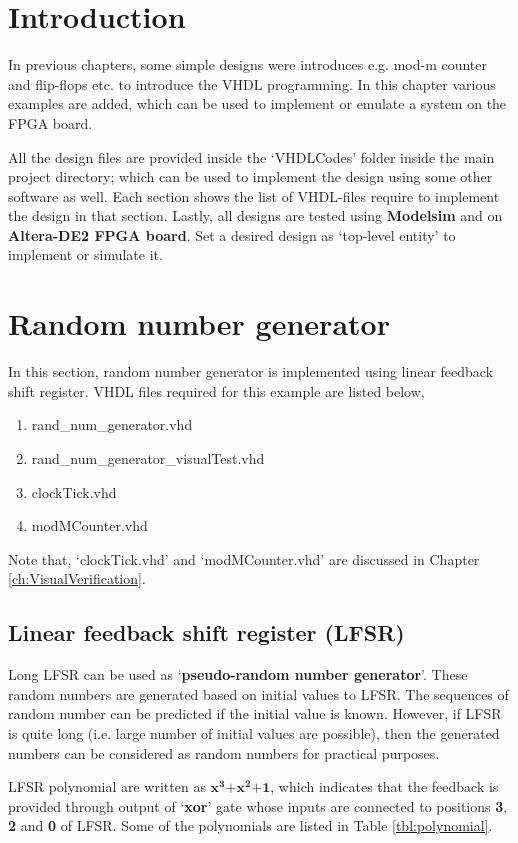 \section{Introduction}
In previous chapters, some simple designs were introduces e.g. mod-m counter and flip-flops etc. to introduce the VHDL programming. In this chapter various examples are added, which can be used to implement or emulate a system on the FPGA board. 

All the design files are provided inside the `VHDLCodes' folder inside the main project directory; which can be used to implement the design using some other software as well. Each section shows the list of VHDL-files require to implement the design in that section. Lastly, all designs are tested using \textbf{Modelsim} and on \textbf{Altera-DE2 FPGA board}. Set a desired design as `top-level entity' to implement or simulate it. 

\section{Random number generator}
In this section, random number generator is implemented using linear feedback shift register. VHDL files required for this example are listed below, 
\begin{enumerate}
	\item rand\_num\_generator.vhd
	\item rand\_num\_generator\_visualTest.vhd
	\item clockTick.vhd
	\item modMCounter.vhd
\end{enumerate}
Note that, `clockTick.vhd' and `modMCounter.vhd' are discussed in Chapter \ref{ch:VisualVerification}.

\subsection{Linear feedback shift register (LFSR)}
Long LFSR can be used as `\textbf{pseudo-random number generator}'.  These random numbers are generated based on initial values to LFSR. The sequences of random number can be predicted if the initial value is known. However, if LFSR is quite long (i.e. large number of initial values are possible), then the generated numbers can be considered as random numbers for practical purposes.  

LFSR polynomial are written as \textbf{${{\mathbf{x}}^{\mathbf{3}}}{\mathbf{ + }}{{\mathbf{x}}^{\mathbf{2}}}{\mathbf{ + 1}}$}, which indicates that the feedback is provided through output of `\textbf{xor}' gate whose  inputs are connected to positions \textbf{3}, \textbf{2} and \textbf{0} of LFSR. Some of the polynomials are listed in Table \ref{tbl:polynomial}.


